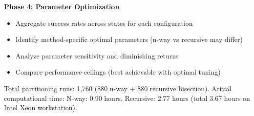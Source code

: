 \textbf{Phase 4: Parameter Optimization}
\begin{itemize}
\item Aggregate success rates across states for each configuration
\item Identify method-specific optimal parameters (n-way vs recursive may differ)
\item Analyze parameter sensitivity and diminishing returns
\item Compare performance ceilings (best achievable with optimal tuning)
\end{itemize}

Total partitioning runs: 1,760 (880 n-way + 880 recursive bisection). Actual computational time: N-way: 0.90 hours, Recursive: 2.77 hours (total 3.67 hours on Intel Xeon workstation).
